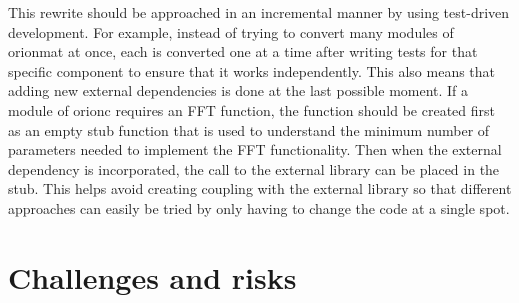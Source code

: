This rewrite should be approached in an incremental manner by
using test-driven development. For example, instead of trying to convert many
modules of \gls{orionmat} at once, each is converted one at a
time after writing tests for that specific component to ensure
that it works independently. This also means that adding new
external dependencies is done at the last possible moment. If a
module of \gls{orionc} requires an \acrshort{FFT} function,
the function should be created first as an empty stub function
that is used to understand the minimum number of parameters needed
to implement the FFT functionality. Then when the external dependency
is incorporated, the call to the external library can be placed in
the stub. This helps avoid creating coupling with the external
library so that different approaches can easily be tried by only
having to change the code at a single spot.

\section{Challenges and risks}

